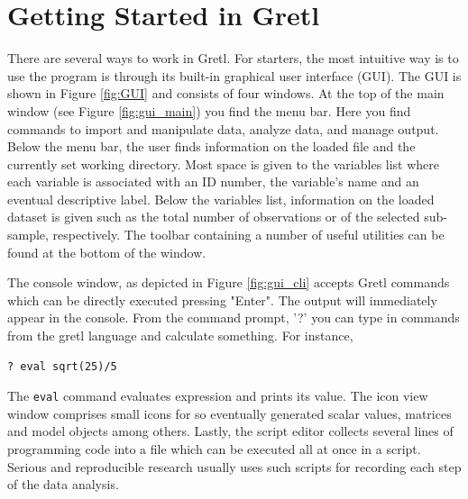 \documentclass[11pt]{article}
\begin{document}
\section{Getting Started in Gretl}
There are several ways to work in Gretl. For starters, the most intuitive way is to use the program is through its built-in graphical user interface (GUI). The GUI is shown in Figure \ref{fig:GUI} and consists of four windows. At the top of the main window (see Figure \ref{fig:gui_main}) you find the menu bar. Here you find commands to  import and manipulate data, analyze data, and manage output. Below the menu bar, the user finds information on the loaded file and the currently set working directory. Most space is given to the variables list where each variable is associated with an ID number, the variable's name and an eventual descriptive label. Below the variables list, information on the loaded dataset is given such as the total number of observations or of the selected sub-sample, respectively. The toolbar containing a number of useful utilities can be found at the bottom of the window. 

The console window, as depicted in Figure \ref{fig:gui_cli} accepts Gretl commands which can be directly executed pressing "Enter". The output will immediately appear in the console. From the command prompt, '?' you can type in commands from the gretl language and calculate something. For instance,
\begin{verbatim}
? eval sqrt(25)/5
\end{verbatim}
The \texttt{eval} command evaluates expression and prints its value.
The icon view window comprises small icons for so eventually generated scalar values, matrices and model objects among others. Lastly, the script editor collects several lines of programming code into a file which can be executed all at once in a script. Serious and reproducible research usually uses such scripts for recording each step of the data analysis.  
\end{document}

